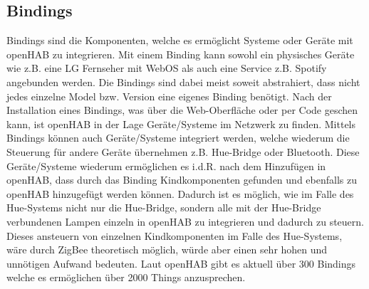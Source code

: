 \subsection{Bindings} \label{sec:Bindings}
Bindings sind die Komponenten, welche es ermöglicht Systeme oder Geräte mit openHAB zu integrieren. Mit einem Binding kann sowohl ein physisches Geräte wie z.B. eine LG Fernseher mit WebOS als auch eine Service z.B. Spotify angebunden werden. Die Bindings sind dabei meist soweit abstrahiert, dass nicht jedes einzelne Model bzw. Version eine eigenes Binding benötigt.
Nach der Installation eines Bindings, was über die Web-Oberfläche oder per Code geschen kann, ist openHAB in der Lage Geräte/Systeme im Netzwerk zu finden. Mittels Bindings können auch Geräte/Systeme integriert werden, welche wiederum die Steuerung für andere Geräte übernehmen z.B. Hue-Bridge oder Bluetooth. Diese Geräte/Systeme wiederum ermöglichen es i.d.R. nach dem Hinzufügen in openHAB, dass durch das Binding Kindkomponenten gefunden und ebenfalls zu openHAB hinzugefügt werden können. Dadurch ist es möglich, wie im Falle des Hue-Systems nicht nur die Hue-Bridge, sondern alle mit der Hue-Bridge verbundenen Lampen einzeln in openHAB zu integrieren und dadurch zu steuern. Dieses ansteuern von einzelnen Kindkomponenten im Falle des Hue-Systems, wäre durch ZigBee theoretisch möglich, würde aber einen sehr hohen und unnötigen Aufwand bedeuten. 
Laut openHAB gibt es aktuell über 300 Bindings welche es ermöglichen über 2000 Things anzusprechen.

